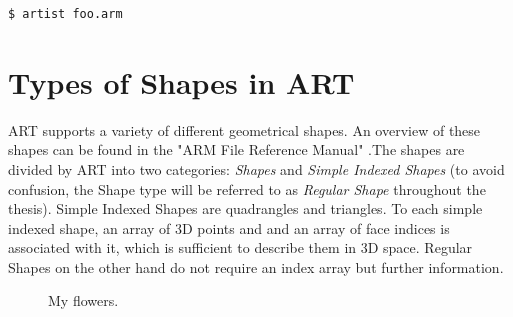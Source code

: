 \begin{lstlisting}[language=bash]
$ artist foo.arm
\end{lstlisting}


\section{Types of Shapes in ART}

ART supports a variety of different geometrical shapes. An overview of these shapes can be found in the "ARM File Reference Manual" \cite{artreferencemanual}.The shapes are divided by ART into two categories: \emph{Shapes} and \emph{Simple Indexed Shapes} (to avoid confusion, the Shape type will be referred to as \emph{Regular Shape} throughout the thesis). Simple Indexed Shapes are quadrangles and triangles. To each simple indexed shape, an array of 3D points and and an array of face indices is associated with it, which is sufficient to describe them in 3D space. 
Regular Shapes on the other hand do not require an index array but further information. 

\begin{figure}[!tbp]
	\centering
	\hfill
	\caption{My flowers.}
\end{figure}



